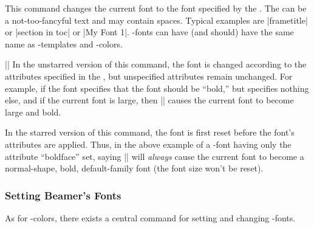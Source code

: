 \begin{command}{\usebeamerfont\opt{|*|}}
  This command changes the current font to the font specified by the . The  can be a not-too-fancyful text and may contain spaces. Typical examples are |frametitle| or |section in toc| or |My Font 1|. \beamer-fonts can have (and should) have the same name as \beamer-templates and \beamer-colors.

  \example ||
  In the unstarred version of this command, the font is changed according to the attributes specified in the , but unspecified attributes remain unchanged. For example, if the font specifies that the font should be ``bold,'' but specifies nothing else, and if the current font is large, then |\usebeamerfont| causes the current font to become large and bold.

  In the starred version of this command, the font is first reset before the font's attributes are applied. Thus, in the above example of a \beamer-font having only the attribute ``boldface'' set, saying |\usebeamerfont*| will \emph{always} cause the current font to become a normal-shape, bold, default-family font (the font size won't be reset).
\end{command}


\subsubsection{Setting Beamer's Fonts}

As for \beamer-colors, there exists a central command for setting and
changing \beamer-fonts.

